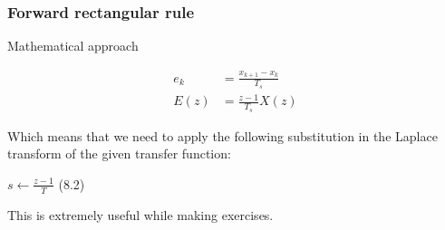 \begin{frame}
	\frametitle{Forward rectangular rule}
	\begin{block}{Mathematical approach}
		\begin{center}
			\begin{align*}
			e_k &= \frac{x_{k+1} - x_{k}}{T_s}\\
			E(z) &= \frac{z -1}{T_s} X(z)
			\end{align*}
		\end{center}
		Which means that we need to apply the following substitution in the Laplace transform of the given transfer function:
		\begin{center}
			$s \gets \frac{z-1}{T}$ (8.2)
		\end{center}
		This is extremely useful while making exercises.
	\end{block}
\end{frame}

